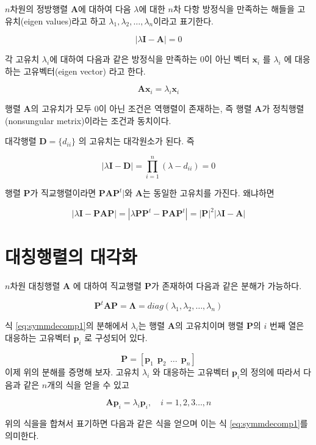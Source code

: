\documentclass[
]{book}
\theoremstyle{definition}
\theoremstyle{definition}
\theoremstyle{definition}
\theoremstyle{remark}
\begin{document}
\(n\)차원의 정방행렬 \(\bm A\)에 대하여 다음 \(\lambda\)에 대한 \(n\)차 다항 방정식을 만족하는 해들을 고유치(eigen values)라고 하고 \(\lambda_1, \lambda_2, \dots , \lambda_n\)이라고 표기한다.

\[ | \lambda \bm I - \bm A | = 0 \]

각 고유치 \(\lambda_i\)에 대하여 다음과 같은 방정식을 만족하는 0이 아닌 벡터 \(\bm x_i\) 를 \(\lambda_i\) 에 대응하는 고유벡터(eigen vector) 라고 한다.

\[ \bm A \bm x_i = \lambda_i \bm x_i \]

행렬 \(\bm A\)의 고유치가 모두 0이 아닌 조건은 역행렬이 존재하는, 즉 행렬 \(\bm A\)가 정칙행렬(nonsungular metrix)이라는 조건과 동치이다.

대각행렬 \(\bm D = \{ d_{ii} \}\) 의 고유치는 대각원소가 된다. 즉

\[ | \lambda \bm I - \bm D | = \prod_{i=1}^n (\lambda - d_{ii}) =0 \]

행렬 \(\bm P\)가 직교행렬이라면 \(\bm P \bm A \bm P^t|\)와 \(\bm A\)는 동일한 고유치를 가진다. 왜냐하면

\[ | \lambda \bm I - \bm P \bm A \bm P | = |\lambda \bm P \bm P^t - \bm P \bm A \bm P^t| = |\bm P|^2 | \lambda \bm I - \bm A | \]

\hypertarget{uxb300uxce6duxd589uxb82cuxc758-uxb300uxac01uxd654}{%
\section{대칭행렬의 대각화}\label{uxb300uxce6duxd589uxb82cuxc758-uxb300uxac01uxd654}}

\(n\)차원 대칭행렬 \(\bm A\) 에 대하여 직교행렬 \(\bm P\)가 존재하여 다음과 같은 분해가 가능하다.

\begin{equation}
 \bm P^t \bm A \bm P = \bm \Lambda = diag(\lambda_1, \lambda_2, \dots, \lambda_n) 
 \label{eq:symmdecomp1}
\end{equation}

식 \eqref{eq:symmdecomp1}의 분해에서 \(\lambda_i\)는 행렬 \(\bm A\)의 고유치이며 행렬 \(\bm P\)의 \(i\) 번째 열은 대응하는 고유벡터 \(\bm p_i\) 로 구성되어 있다.

\[ \bm P = [ \bm p_1~~ \bm p_2 ~~ \dots ~~ \bm p_n ] \]
이제 위의 분해를 증명해 보자. 고유치 \(\lambda_i\) 와 대응하는 고유벡터 \(\bm p_i\)의 정의에 따라서 다음과 같은 \(n\)개의 식을 얻을 수 있고

\[ \bm A \bm p_i = \lambda_i \bm p_i , \quad i=1,2,3\dots, n \]

위의 식을을 합쳐서 표기하면 다음과 같은 식을 얻으며 이는 식 \eqref{eq:symmdecomp1}를 의미한다.
\end{document}
